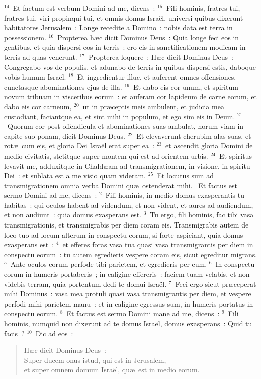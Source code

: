 ${}^{14}$~Et factum est verbum Domini ad me, dicens~:
${}^{15}$~Fili hominis, fratres tui, fratres tui, viri propinqui tui, et omnis domus Isra\"el, universi quibus dixerunt habitatores Jerusalem~: Longe recedite a Domino~: nobis data est terra in possessionem.
${}^{16}$~Propterea h\ae c dicit Dominus Deus~: Quia longe feci eos in gentibus, et quia dispersi eos in terris~: ero eis in sanctificationem modicam in terris ad quas venerunt.
${}^{17}$~Propterea loquere~: H\ae c dicit Dominus Deus~: Congregabo vos de populis, et adunabo de terris in quibus dispersi estis, daboque vobis humum Isra\"el.
${}^{18}$~Et ingredientur illuc, et auferent omnes offensiones, cunctasque abominationes ejus de illa.
${}^{19}$~Et dabo eis cor unum, et spiritum novum tribuam in visceribus eorum~: et auferam cor lapideum de carne eorum, et dabo eis cor carneum,
${}^{20}$~ut in pr\ae ceptis meis ambulent, et judicia mea custodiant, faciantque ea, et sint mihi in populum, et ego sim eis in Deum.
${}^{21}$~Quorum cor post offendicula et abominationes suas ambulat, horum viam in capite suo ponam, dicit Dominus Deus.
${}^{22}$~Et elevaverunt cherubim alas suas, et rot\ae\ cum eis, et gloria Dei Isra\"el erat super ea~:
${}^{23}$~et ascendit gloria Domini de medio civitatis, stetitque super montem qui est ad orientem urbis.
${}^{24}$~Et spiritus levavit me, adduxitque in Chald\ae am ad transmigrationem, in visione, in spiritu Dei~: et sublata est a me visio quam videram.
${}^{25}$~Et locutus sum ad transmigrationem omnia verba Domini qu\ae\ ostenderat mihi.
~Et factus est sermo Domini ad me, dicens~:
${}^{2}$~Fili hominis, in medio domus exasperantis tu habitas~: qui oculos habent ad videndum, et non vident, et aures ad audiendum, et non audiunt~: quia domus exasperans est.
${}^{3}$~Tu ergo, fili hominis, fac tibi vasa transmigrationis, et transmigrabis per diem coram eis. Transmigrabis autem de loco tuo ad locum alterum in conspectu eorum, si forte aspiciant, quia domus exasperans est~:
${}^{4}$~et efferes foras vasa tua quasi vasa transmigrantis per diem in conspectu eorum~: tu autem egredieris vespere coram eis, sicut egreditur migrans.
${}^{5}$~Ante oculos eorum perfode tibi parietem, et egredieris per eum.
${}^{6}$~In conspectu eorum in humeris portaberis~; in caligine effereris~: faciem tuam velabis, et non videbis terram, quia portentum dedi te domui Isra\"el.
${}^{7}$~Feci ergo sicut pr\ae ceperat mihi Dominus~: vasa mea protuli quasi vasa transmigrantis per diem, et vespere perfodi mihi parietem manu~: et in caligine egressus sum, in humeris portatus in conspectu eorum.
${}^{8}$~Et factus est sermo Domini mane ad me, dicens~:
${}^{9}$~Fili hominis, numquid non dixerunt ad te domus Isra\"el, domus exasperans~: Quid tu facis~?
${}^{10}$~Dic ad eos~: \begin{flushleft}\begin{verse}H\ae c dicit Dominus Deus~:\\ Super ducem onus istud, qui est in Jerusalem,\\ et super omnem domum Isra\"el, qu\ae\ est in medio eorum.\end{verse}\end{flushleft}


